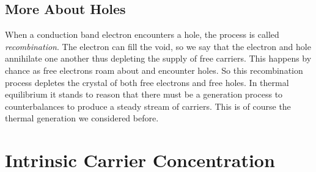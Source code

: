 \subsection{More About Holes}
When a conduction band electron encounters a hole, the process is called \textit{recombination}.  The electron can fill the void, so we say that the electron and hole annihilate one another thus depleting the supply of free carriers.  This happens by chance as free electrons roam about and encounter holes.  So this recombination process depletes the crystal of both free electrons and free holes.  In thermal equilibrium it stands to reason that there must be a generation process to counterbalances to produce a steady stream of carriers.  This is of course the thermal generation we considered before.
\section{Intrinsic Carrier Concentration}
